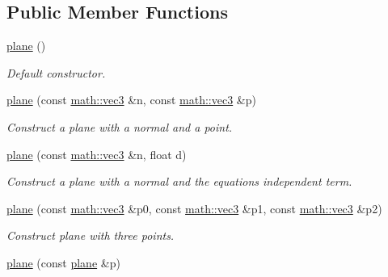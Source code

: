 \subsection*{Public Member Functions}
\begin{DoxyCompactItemize}
\item 
\mbox{\label{classphysim_1_1geometric_1_1plane_a984cb3039847ca3c6f899b2bc14b87d7}} 
\hyperlink{classphysim_1_1geometric_1_1plane_a984cb3039847ca3c6f899b2bc14b87d7}{plane} ()
\begin{DoxyCompactList}\small\item\em Default constructor. \end{DoxyCompactList}\item 
\hyperlink{classphysim_1_1geometric_1_1plane_a7ebf0374eab0ff75293894fb45b5fe99}{plane} (const \hyperlink{structphysim_1_1math_1_1vec3}{math\+::vec3} \&n, const \hyperlink{structphysim_1_1math_1_1vec3}{math\+::vec3} \&p)
\begin{DoxyCompactList}\small\item\em Construct a plane with a normal and a point. \end{DoxyCompactList}\item 
\hyperlink{classphysim_1_1geometric_1_1plane_a3888aab8477d2f1e182bef0955b8e351}{plane} (const \hyperlink{structphysim_1_1math_1_1vec3}{math\+::vec3} \&n, float d)
\begin{DoxyCompactList}\small\item\em Construct a plane with a normal and the equation\textquotesingle{}s independent term. \end{DoxyCompactList}\item 
\hyperlink{classphysim_1_1geometric_1_1plane_a5d793dd111e0b7c83c7e11b47c037637}{plane} (const \hyperlink{structphysim_1_1math_1_1vec3}{math\+::vec3} \&p0, const \hyperlink{structphysim_1_1math_1_1vec3}{math\+::vec3} \&p1, const \hyperlink{structphysim_1_1math_1_1vec3}{math\+::vec3} \&p2)
\begin{DoxyCompactList}\small\item\em Construct plane with three points. \end{DoxyCompactList}\item 
\mbox{\label{classphysim_1_1geometric_1_1plane_ace21e246bc645de9375a24cb8584e5da}} 
\hyperlink{classphysim_1_1geometric_1_1plane_ace21e246bc645de9375a24cb8584e5da}{plane} (const \hyperlink{classphysim_1_1geometric_1_1plane}{plane} \&p)

\end{DoxyCompactItemize}
